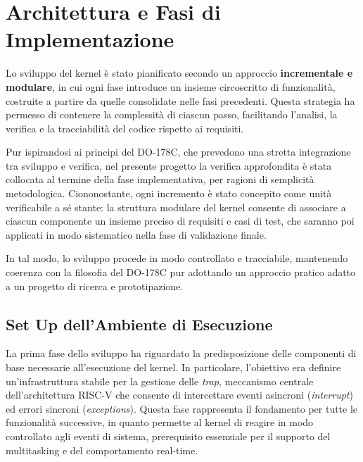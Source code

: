 \documentclass[italian, Lau, oneside]{sapthesis} %
\begin{document}
\section{Architettura e Fasi di Implementazione}

Lo sviluppo del kernel è stato pianificato secondo un approccio \textbf{incrementale e modulare}, in cui ogni fase introduce un insieme circoscritto di funzionalità, costruite a partire da quelle consolidate nelle fasi precedenti.  
Questa strategia ha permesso di contenere la complessità di ciascun passo, facilitando l’analisi, la verifica e la tracciabilità del codice rispetto ai requisiti.

Pur ispirandosi ai principi del DO-178C, che prevedono una stretta integrazione tra sviluppo e verifica, nel presente progetto la verifica approfondita è stata collocata al termine della fase implementativa, per ragioni di semplicità metodologica.  
Ciononostante, ogni incremento è stato concepito come unità verificabile a sé stante: la struttura modulare del kernel consente di associare a ciascun componente un insieme preciso di requisiti e casi di test, che saranno poi applicati in modo sistematico nella fase di validazione finale.

In tal modo, lo sviluppo procede in modo controllato e tracciabile, mantenendo coerenza con la filosofia del DO-178C pur adottando un approccio pratico adatto a un progetto di ricerca e prototipazione.

\subsection{Set Up dell’Ambiente di Esecuzione}

La prima fase dello sviluppo ha riguardato la predisposizione delle componenti di base necessarie all’esecuzione del kernel.  
In particolare, l’obiettivo era definire un’infrastruttura stabile per la gestione delle \emph{trap}, meccanismo centrale dell’architettura RISC-V che consente di intercettare eventi asincroni (\textit{interrupt}) ed errori sincroni (\textit{exceptions}).  
Questa fase rappresenta il fondamento per tutte le funzionalità successive, in quanto permette al kernel di reagire in modo controllato agli eventi di sistema, prerequisito essenziale per il supporto del multitasking e del comportamento real-time.
\end{document}
